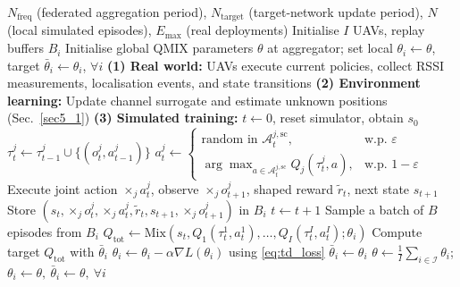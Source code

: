 \documentclass[drones,article,accept,pdftex,moreauthors]{Definitions/mdpi}
\begin{document}
\begin{algorithm}[H]
\caption{Model-Aided FedQMIX}
\label{alg:FedQMIX}
\begin{algorithmic}[1]
\Require $N_{\text{freq}}$ (federated aggregation period), $N_{\text{target}}$ (target-network update period), $N$ (local simulated episodes), $E_{\max}$ (real deployments)
\State Initialise $I$ UAVs, replay buffers $B_i$
\State Initialise global QMIX parameters $\theta$ at aggregator; set local $\theta_i \leftarrow \theta$, target $\bar{\theta}_i \leftarrow \theta_i$, $\forall i$
 
    \State \textbf{(1) Real world:} UAVs execute current policies, collect RSSI measurements, localisation events, and state transitions
    \State \textbf{(2) Environment learning:} Update channel surrogate and estimate unknown positions (Sec.~\ref{sec5_1})
    \State \textbf{(3) Simulated training:}
            \State $t \leftarrow 0$, reset simulator, obtain $s_0$
                    \State $\tau^{j}_t \leftarrow \tau^{j}_{t-1} \cup \{(o^{j}_t,a^{j}_{t-1})\}$
                    \State $a^{j}_t \leftarrow
                        \begin{cases}
                        \text{random in } \mathcal{A}^{j,\mathrm{sc}}_t, & \text{w.p. } \varepsilon\\
                        \arg\max_{a \in \mathcal{A}^{j,\mathrm{sc}}_t} Q_j(\tau^{j}_t,a), & \text{w.p. } 1-\varepsilon
                        \end{cases}$
                \EndFor
                \State Execute joint action $\times_j a^{j}_t$, observe $\times_j o^{j}_{t+1}$, shaped reward $\tilde r_t$, next state $s_{t+1}$
                \State Store $(s_t,\times_j o^{j}_t,\times_j a^{j}_t,\tilde r_t,s_{t+1},\times_j o^{j}_{t+1})$ in $B_i$
                \State $t \leftarrow t+1$
            \EndWhile
            \State Sample a batch of $B$ episodes from $B_i$
                \State $Q_{\text{tot}} \leftarrow \mathrm{Mix}(s_t, Q_1(\tau^1_t,a^1_t),\dots,Q_I(\tau^I_t,a^I_t); \theta_i)$
                \State Compute target $Q_{\text{tot}}$ with $\bar{\theta}_i$
            \EndFor
            \State $\theta_i \leftarrow \theta_i - \alpha \nabla L(\theta_i)$ using \eqref{eq:td_loss}
                \State $\bar{\theta}_i \leftarrow \theta_i$ 
            \EndIf
        \EndFor
            \State $\theta \leftarrow \frac{1}{I}\sum_{i\in\mathcal{I}}\theta_i$; \quad $\theta_i \leftarrow \theta,\ \bar{\theta}_i \leftarrow \theta,\ \forall i$
        \EndIf
    \EndFor
\EndFor
\end{algorithmic}
\end{algorithm}
\end{document}
